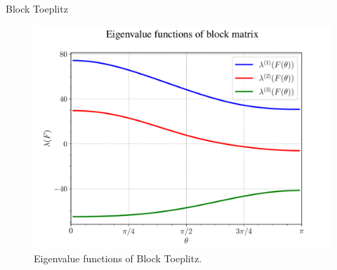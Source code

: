 \documentclass{beamer}
\begin{document}
\begin{frame}{Block Toeplitz}
    \begin{figure}
        \centering
        \includegraphics[width=0.7\linewidth]{images/Block_eigfunc.pdf}
        \caption{Eigenvalue functions of Block Toeplitz.}
        \label{Block eigfunc}
    \end{figure}
\end{frame}

\end{document}
